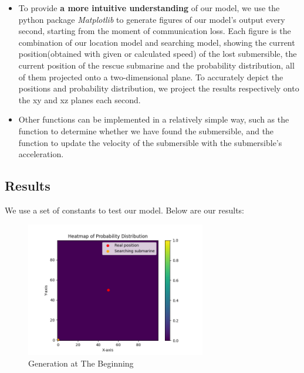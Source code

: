 \documentclass[12pt]{article}
\begin{document}
\begin{itemize}
    \item To provide \textbf{a more intuitive understanding} of our model, we use the python package \textit{Matplotlib} to generate figures of our model's output every second, starting from the moment of communication loss. Each figure is the combination of our location model and searching model, showing the current position(obtained with given or calculated speed) of the lost submersible, the current position of the rescue submarine and the probability distribution, all of them projected onto a two-dimensional plane. To accurately depict the positions and probability distribution, we project the results respectively onto the xy and xz planes each second.
    \item Other functions can be implemented in a relatively simple way, such as the function to determine whether we have found the submersible, and the function to update the velocity of the submersible with the submersible's acceleration.
\end{itemize}
\subsection{Results}
We use a set of constants to test our model. Below are our results:\\
\begin{figure}[H]
\centering
\includegraphics[width=0.7\textwidth]{0-xy.png}
\caption{Generation at The Beginning}
\label{fig:re1}
\end{figure}
\end{document}
